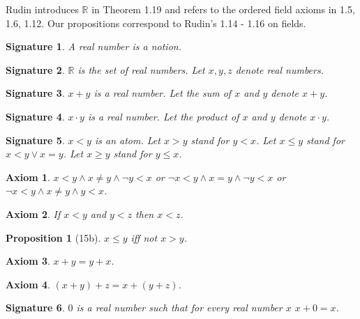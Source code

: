 \documentclass{article}
\newenvironment{forthel}{\begin{leftbar}}{\end{leftbar}}
\newtheorem{axiom}{Axiom}
\newtheorem{signature}{Signature}
\newtheorem{proposition}{Proposition}
\newcommand{\RR}{\mathbb{R}}
\begin{document}
Rudin introduces $\RR$ in Theorem 1.19 and refers to the ordered field 
axioms in 1.5, 1.6, 1.12. Our propositions correspond to Rudin's 1.14 - 1.16 on fields. 

\begin{forthel}
[number/-s]

\begin{signature} A \emph{real number} is a notion.\end{signature}
\begin{signature} $\RR$ is the set of \emph{real numbers}.
Let $x,y,z$ denote real numbers.
\end{signature}

\begin{signature} $x + y$ is a real number.
Let the \emph{sum} of $x$ and $y$ denote $x + y$.\end{signature}

\begin{signature} $x \cdot y$ is a real number.
Let the \emph{product} of $x$ and $y$ denote $x \cdot y$.\end{signature}

\begin{signature} $x < y$ is an atom.
Let $x > y$ stand for $y < x$.
Let $x \leq y$ stand for $x < y \vee x = y$.
Let $x \geq y$ stand for $y \leq x$.\end{signature}

\begin{axiom} $x < y \wedge x \neq y \wedge \neg y < x$
or $\neg x < y \wedge x = y \wedge \neg y < x$
or $\neg x < y \wedge x \neq y \wedge y < x$.\end{axiom}

\begin{axiom} If $x < y$ and $y < z$ then $x < z$.
\end{axiom}

\begin{proposition}[15b] $x \leq y$ iff not $x > y$.\end{proposition}

\begin{axiom} $x + y = y + x$.\end{axiom}

\begin{axiom} $(x + y) + z = x + (y + z)$.\end{axiom}

\begin{signature} $0$ is a real number such that
for every real number $x$ $x + 0 = x$.\end{signature}


\end{forthel}
\end{document}
